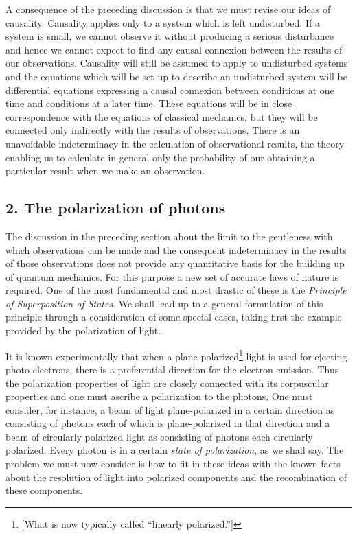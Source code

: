 A consequence of the preceding discussion is that we must revise our ideas of causality.  Causality applies only to a system which is left undisturbed.  If a system is small, we cannot observe it without producing a serious disturbance and hence we cannot expect to find any causal connexion between the results of our observations.  Causality will still be assumed to apply to undisturbed systems and the equations which will be set up to describe an undisturbed system will be differential equations expressing a causal connexion between conditions at one time and conditions at a later time.  These equations will be in close correspondence with the equations of classical mechanics, but they will be connected only indirectly with the results of observations.  There is an unavoidable indeterminacy in the calculation of observational results, the theory enabling us to calculate in general only the probability of our obtaining a particular result when we make an observation.

\subsection{2. The polarization of photons}

The discussion in the preceding section about the limit to the gentleness with which observations can be made and the consequent indeterminacy in the results of those observations does not provide any quantitative basis for the building up of quantum mechanics.  For this purpose a new set of accurate laws of nature is required.  One of the most fundamental and most drastic of these is the \emph{Principle of Superposition of States}.  We shall lead up to a general formulation of this principle through a consideration of some special cases, taking first the example provided by the polarization of light.  

It is known experimentally that when a plane-polarized\footnote{[What is now typically called ``linearly polarized.'']} light is used for ejecting photo-electrons, there is a preferential direction for the electron emission.  Thus the polarization properties of light are closely connected with its corpuscular properties and one must ascribe a polarization to the photons.  One must consider, for instance, a beam of light plane-polarized in a certain direction as consisting of photons each of which is plane-polarized in that direction and a beam of circularly polarized light as consisting of photons each circularly polarized.  Every photon is in a certain \emph{state of polarization}, as we shall say.  The problem we must now consider is how to fit in these ideas with the known facts about the resolution of light into polarized components and the recombination of these components.

